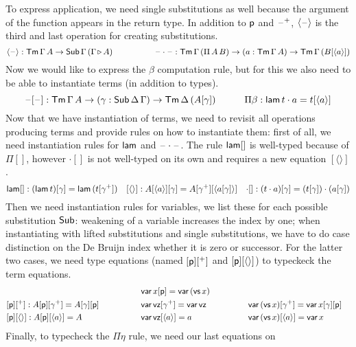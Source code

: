 \documentclass{easychair}
\begin{document}
To express application, we need single substitutions as well because
the argument of the function appears in the return type. In addition
to $\mathsf{p}$ and $\mathord{\hspace{1pt}\text{--}\hspace{1pt}}^+$, $\langle\mathord{\hspace{1pt}\text{--}\hspace{1pt}}\rangle$ is the third and last
operation for creating substitutions.
\[
\langle\mathord{\hspace{1pt}\text{--}\hspace{1pt}}\rangle : \mathsf{Tm}\,\Gamma\,A\rightarrow\mathsf{Sub}\,\Gamma\,(\Gamma\mathop{\triangleright} A) \hspace{5em} \mathord{\hspace{1pt}\text{--}\hspace{1pt}}\cdot\mathord{\hspace{1pt}\text{--}\hspace{1pt}}: \mathsf{Tm}\,\Gamma\,(\Pi\,A\,B)\rightarrow(a:\mathsf{Tm}\,\Gamma\,A)\rightarrow\mathsf{Tm}\,\Gamma\,(B[\langle a\rangle])
\]
Now we would like to express the $\beta$ computation rule, but for
this we also need to be able to instantiate terms (in addition to
types).
\[
\mathord{\hspace{1pt}\text{--}\hspace{1pt}}[\mathord{\hspace{1pt}\text{--}\hspace{1pt}}] : \mathsf{Tm}\,\Gamma\,A\rightarrow(\gamma:\mathsf{Sub}\,\Delta\,\Gamma)\rightarrow\mathsf{Tm}\,\Delta\,(A[\gamma]) \hspace{3em} \Pi\beta : \mathsf{lam}\,t\cdot a = t[\langle a\rangle] 
\]
Now that we have instantiation of terms, we need to revisit all
operations producing terms and provide rules on how to instantiate
them: first of all, we need instantiation rules for $\mathsf{lam}$ and
$\mathord{\hspace{1pt}\text{--}\hspace{1pt}}\cdot\mathord{\hspace{1pt}\text{--}\hspace{1pt}}$. The rule $\mathsf{lam}[]$ is well-typed because of
$\Pi[]$, however ${\cdot}[]$ is not well-typed on its own and requires
a new equation $[\langle\rangle]$.
\[
\mathsf{lam}[] : (\mathsf{lam}\,t)[\gamma] = \mathsf{lam}\,(t[\gamma^+]) \hspace{1em} [\langle\rangle] : A[\langle a\rangle][\gamma] = A[\gamma^+][\langle a[\gamma]\rangle] \hspace{1em} {\cdot}[] : (t\cdot a)[\gamma] = (t[\gamma])\cdot(a[\gamma])
\]
Then we need instantiation rules for variables, we list these for each
possible substitution $\mathsf{Sub}$: weakening of a variable increases the index by
one; when instantiating with lifted substitutions and single
substitutions, we have to do case distinction on the De Bruijn index
whether it is zero or successor. For the latter two cases, we need
type equations (named $[\mathsf{p}][^+]$ and $[\mathsf{p}][\langle\rangle]$) to
typeckeck the term equations.
\begin{alignat*}{10}
  & && \var\,x[\p] = \var\,(\vs\,x) \\
  & [\p][^+] : A[\p][\gamma^+] = A[\gamma][\p] \hspace{4em}&& \var\,\vz[\gamma^+] = \var\,\vz \hspace{4em} && \var\,(\vs\,x)[\gamma^+] = \var\,x[\gamma][\p] \\
  & [\p][\langle\rangle] : A[\p][\langle a\rangle] = A && \var\,\vz[\langle a\rangle] = a &&  \var\,(\vs\,x)[\langle a\rangle] = \var\,x
\end{alignat*}
Finally, to typecheck the $\Pi\eta$ rule, we need our last equations on
\end{document}
